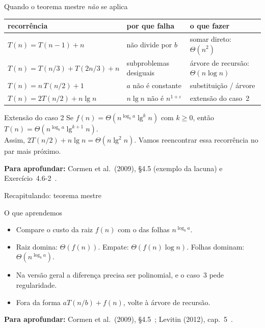 \documentclass[aspectratio=169,xcolor=table]{beamer}
\newcommand{\fonte}[1]{%
  \vfill
  {\tiny\color{gray!55!black}\textbf{Para aprofundar:} #1\par}%
}
\begin{document}
\begin{frame}{Quando o teorema mestre \emph{não} se aplica}
  \begin{center}
  \scriptsize
  \begin{tabular}{lll}
    \toprule
    recorrência & por que falha & o que fazer \\
    \midrule
    $T(n)=T(n-1)+n$           & não divide por $b$         & somar direto: $\Theta(n^2)$ \\
    $T(n)=T(n/3)+T(2n/3)+n$   & subproblemas desiguais     & árvore de recursão: $\Theta(n\log n)$ \\
    $T(n)=n\,T(n/2)+1$        & $a$ não é constante        & substituição / árvore \\
    \rowcolor{orange!15}
    $T(n)=2T(n/2)+n\lg n$     & $n\lg n$ não é $n^{1+\varepsilon}$ & extensão do caso~2 \\
    \bottomrule
  \end{tabular}
  \end{center}
  \begin{block}{Extensão do caso 2}
    \scriptsize Se $f(n)=\Theta(n^{\log_b a}\lg^k n)$ com $k\ge 0$, então
    $T(n)=\Theta(n^{\log_b a}\lg^{k+1} n)$.\\
    Assim, $2T(n/2)+n\lg n=\Theta(n\lg^2 n)$. Vamos reencontrar essa recorrência
    no par mais próximo.
  \end{block}
  \fonte{Cormen et al.\ (2009), \S 4.5 (exemplo da lacuna) e Exercício~4.6-2~\cite{cormen2009introduction}.}
\end{frame}

\begin{frame}{Recapitulando: teorema mestre}
  \begin{block}{O que aprendemos}
    \begin{itemize}\small
      \item Compare o custo da raiz $f(n)$ com o das folhas $n^{\log_b a}$.
      \item Raiz domina: $\Theta(f(n))$. Empate: $\Theta(f(n)\log n)$. Folhas dominam: $\Theta(n^{\log_b a})$.
      \item Na versão geral a diferença precisa ser polinomial, e o caso~3 pede regularidade.
      \item Fora da forma $aT(n/b)+f(n)$, volte à árvore de recursão.
    \end{itemize}
  \end{block}
  \fonte{Cormen et al.\ (2009), \S 4.5~\cite{cormen2009introduction};
    Levitin (2012), cap.~5~\cite{levitin2012introduction}.}
\end{frame}
\end{document}
